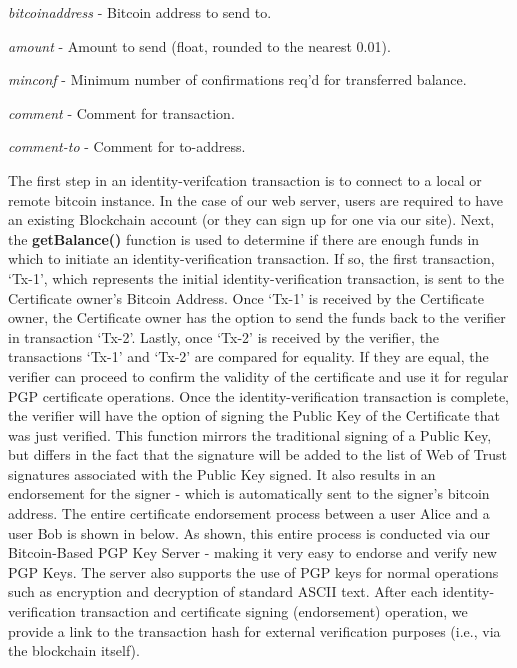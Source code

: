 \documentclass{llncs}
\begin{document}
\begin {compactitem}
\item \textit{bitcoinaddress} - Bitcoin address to send to.
\item \textit{amount} - Amount to send (float, rounded to the nearest 0.01).
\item \textit{minconf} - Minimum number of confirmations req'd for transferred balance.
\item \textit{comment} - Comment for transaction. 
\item \textit{comment-to} - Comment for to-address. \\
\end {compactitem}

The first step in an identity-verifcation transaction is to connect to a local or remote bitcoin instance.  In the case of our web server, users are required to have an existing Blockchain account (or they can sign up for one via our site).   Next, the \textbf{getBalance()} function is used to  determine if there are enough funds in which to initiate an identity-verification transaction.  If so, the first transaction, `Tx-1', which represents the initial identity-verification transaction, is sent to the Certificate owner's Bitcoin Address.  Once `Tx-1' is received by the Certificate owner, the Certificate owner has the option to send the funds back to the verifier in transaction `Tx-2'.  Lastly, once `Tx-2' is received by the verifier, the transactions `Tx-1' and `Tx-2' are compared for equality.  If they are equal, the verifier can proceed to confirm the validity of the certificate and use it for regular PGP certificate operations.  Once the identity-verification transaction is complete, the verifier will have the option of signing the Public Key of the Certificate that was just verified.  This function mirrors the traditional signing of a Public Key, but differs in the fact that the signature will be added to the list of Web of Trust signatures associated with the Public Key signed.  It also results in an endorsement for the signer - which is automatically sent to the signer's bitcoin address. The entire certificate endorsement process between a user Alice and a user Bob is shown in below.  As shown, this entire process is conducted via our Bitcoin-Based PGP Key Server - making it very easy to endorse and verify new PGP Keys.  The server also supports the use of PGP keys for normal operations such as encryption and decryption of standard ASCII text.  After each identity-verification transaction and certificate signing (endorsement) operation, we provide a link to the transaction hash for external verification purposes (i.e., via the blockchain itself).
\end{document}
